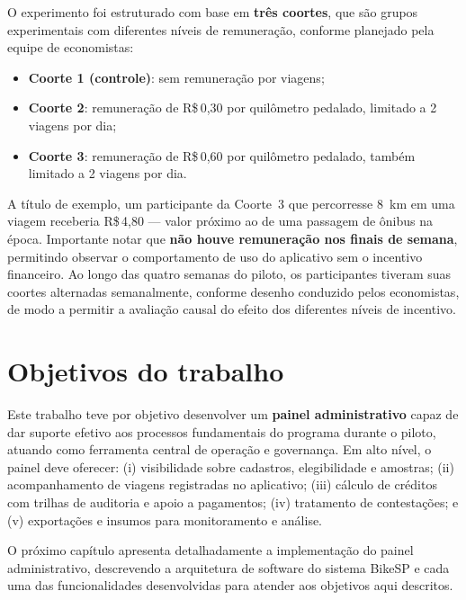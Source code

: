 O experimento foi estruturado com base em \textbf{três coortes}, que são grupos experimentais com diferentes níveis de
remuneração, conforme planejado pela equipe de economistas:
\begin{itemize}
  \item \textbf{Coorte 1 (controle)}: sem remuneração por viagens;
  \item \textbf{Coorte 2}: remuneração de R\$\,0,30 por quilômetro pedalado,
        limitado a 2 viagens por dia;
  \item \textbf{Coorte 3}: remuneração de R\$\,0,60 por quilômetro pedalado,
        também limitado a 2 viagens por dia.
\end{itemize}
A título de exemplo, um participante da Coorte~3 que percorresse 8~km em uma
viagem receberia R\$\,4,80 --- valor próximo ao de uma passagem de ônibus na
época. Importante notar que \textbf{não houve remuneração nos finais de semana},
permitindo observar o comportamento de uso do aplicativo sem o incentivo
financeiro. Ao longo das quatro semanas do piloto, os participantes tiveram suas
coortes alternadas semanalmente, conforme desenho conduzido pelos economistas,
de modo a permitir a avaliação causal do efeito dos diferentes níveis de
incentivo.


\section{Objetivos do trabalho}
\label{sec:objetivos-trabalho}
Este trabalho teve por objetivo desenvolver um \textbf{painel administrativo} capaz
de dar suporte efetivo aos processos fundamentais do programa durante o piloto,
atuando como ferramenta central de operação e governança. Em alto nível, o
painel deve oferecer: (i) visibilidade sobre cadastros, elegibilidade e
amostras; (ii) acompanhamento de viagens registradas no aplicativo; (iii)
cálculo de créditos com trilhas de auditoria e apoio a pagamentos; (iv)
tratamento de contestações; e (v) exportações e insumos para monitoramento e
análise.

O próximo capítulo apresenta detalhadamente a implementação do painel administrativo, descrevendo a arquitetura de software do sistema BikeSP e cada uma das funcionalidades desenvolvidas para atender aos objetivos aqui descritos.


